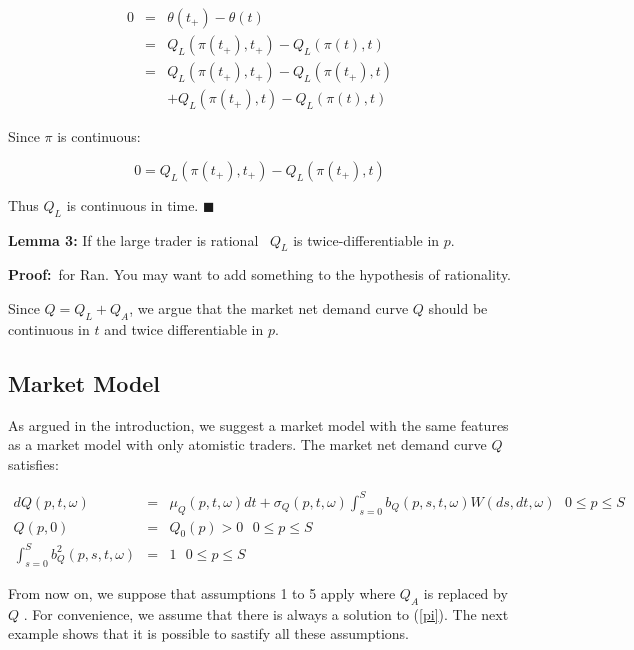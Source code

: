 \documentclass{article}
\begin{document}
\begin{eqnarray*}
0 &=&\theta (t_{+})-\theta (t) \\
&=&Q_{L}(\pi (t_{+}),t_{+})-Q_{L}(\pi (t),t) \\
&=&Q_{L}(\pi (t_{+}),t_{+})-Q_{L}(\pi (t_{+}),t) \\
&&+Q_{L}(\pi (t_{+}),t)-Q_{L}(\pi (t),t)
\end{eqnarray*}

Since $\pi $ is continuous$:$

\begin{equation*}
0=Q_{L}(\pi (t_{+}),t_{+})-Q_{L}(\pi (t_{+}),t)
\end{equation*}

Thus $Q_{L}$ is continuous in time. $\blacksquare $

\bigskip

\textbf{Lemma 3: }If the large trader is rational \ $Q_{L}$ is
twice-differentiable in $p$.

\bigskip

\textbf{Proof:}\ for Ran. You may want to add something to the hypothesis of
rationality.

Since $Q=Q_{L}+Q_{A}$, we argue that the market net demand curve $Q$ should
be continuous in $t$ and twice differentiable in $p$.

\bigskip

\subsection{Market Model}

As argued in the introduction, we suggest a market model with the same
features as a market model with only atomistic traders. The market net
demand curve $Q$ satisfies:

\begin{eqnarray}
dQ(p,t,\omega ) &=&\mu _{Q}(p,t,\omega )dt+\sigma _{Q}(p,t,\omega
)\int_{s=0}^{S}b_{Q}(p,s,t,\omega )W(ds,dt,\omega )\text{ \ \ \ }0\leq p\leq
S  \label{MM1} \\
Q(p,0) &=&Q_{0}(p)>0\text{ \ \ \ \ \ \ \ \ }0\leq p\leq S  \label{MM2} \\
\int_{s=0}^{S}b_{Q}^{2}(p,s,t,\omega ) &=&1\text{ \ \ \ \ \ \ \ \ }0\leq
p\leq S  \label{MM3}
\end{eqnarray}

From now on, we suppose that assumptions 1 to 5 apply where $Q_{A}$ is
replaced by $Q$ . For convenience, we assume that there is always a solution
to (\ref{pi}). The next example shows that it is possible to sastify all
these assumptions.
\end{document}
